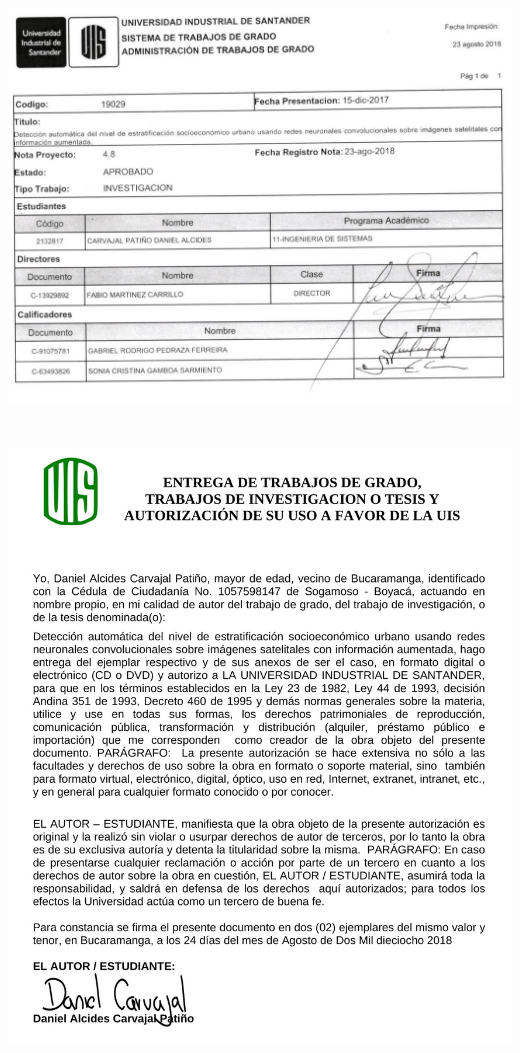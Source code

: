 	\chapter*{}
	\includegraphics[scale=0.33]{img/nota.jpg}{}{} 
    \newpage
    \chapter*{}
    \includegraphics[scale=0.33]{img/carta.jpg}{}{} 

